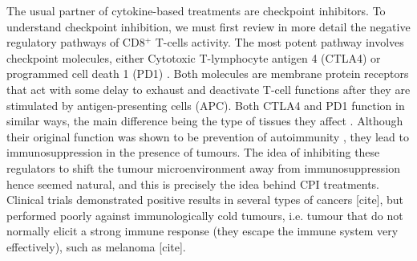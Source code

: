 \documentclass[11pt]{article}
\begin{document}
%
%
\par The usual partner of cytokine-based treatments are checkpoint inhibitors. To understand checkpoint inhibition, we must first review in more detail the negative regulatory pathways of CD8$^+$ T-cells activity. The most potent pathway involves checkpoint molecules, either Cytotoxic T-lymphocyte antigen 4 (CTLA4) or programmed cell death 1 (PD1) \cite{cpiProof}. Both molecules are membrane protein receptors that act with some delay to exhaust and deactivate T-cell functions after they are stimulated by antigen-presenting cells (APC). Both CTLA4 and PD1 function in similar ways, the main difference being the type of tissues they affect \cite{PDvsCTLA}. Although their original function was shown to be prevention of autoimmunity \cite{PD1Autoimmune}, they lead to immunosuppression in the presence of tumours. The idea of inhibiting these regulators to shift the tumour microenvironment away from immunosuppression hence seemed natural, and this is precisely the idea behind CPI treatments. Clinical trials demonstrated positive results in several types of cancers [cite], but performed poorly against immunologically cold tumours, i.e. tumour that do not normally elicit a strong immune response (they escape the immune system very effectively), such as melanoma [cite].  
\end{document}
